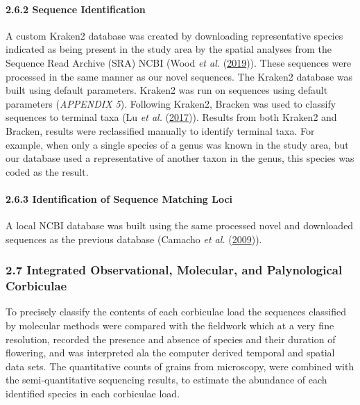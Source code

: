 \documentclass[
]{article}
\begin{document}
\hypertarget{sequence-identification}{%
\paragraph{2.6.2 \textbar{} Sequence
Identification}\label{sequence-identification}}

A custom Kraken2 database was created by downloading representative
species indicated as being present in the study area by the spatial
analyses from the Sequence Read Archive (SRA) NCBI (Wood \emph{et al.}
(\protect\hyperlink{ref-wood2019improved}{2019})). These sequences were
processed in the same manner as our novel sequences. The Kraken2
database was built using default parameters. Kraken2 was run on
sequences using default parameters (\emph{APPENDIX 5}). Following
Kraken2, Bracken was used to classify sequences to terminal taxa (Lu
\emph{et al.} (\protect\hyperlink{ref-lu2017bracken}{2017})). Results
from both Kraken2 and Bracken, results were reclassified manually to
identify terminal taxa. For example, when only a single species of a
genus was known in the study area, but our database used a
representative of another taxon in the genus, this species was coded as
the result.

\hypertarget{identification-of-sequence-matching-loci}{%
\paragraph{2.6.3 \textbar{} Identification of Sequence Matching
Loci}\label{identification-of-sequence-matching-loci}}

A local NCBI database was built using the same processed novel and
downloaded sequences as the previous database (Camacho \emph{et al.}
(\protect\hyperlink{ref-camacho2009blast}{2009})).

\hypertarget{integrated-observational-molecular-and-palynological-corbiculae}{%
\subsubsection{2.7 \textbar{} Integrated Observational, Molecular, and
Palynological
Corbiculae}\label{integrated-observational-molecular-and-palynological-corbiculae}}

To precisely classify the contents of each corbiculae load the sequences
classified by molecular methods were compared with the fieldwork which
at a very fine resolution, recorded the presence and absence of species
and their duration of flowering, and was interpreted ala the computer
derived temporal and spatial data sets. The quantitative counts of
grains from microscopy, were combined with the semi-quantitative
sequencing results, to estimate the abundance of each identified species
in each corbiculae load.
\end{document}
